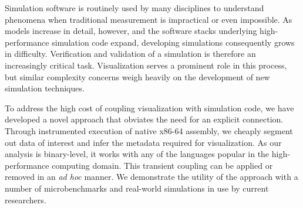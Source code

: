 \newcommand{\addr}[1]{\texttt{#1}}


%

Simulation software is routinely used by many disciplines to understand
phenomena when traditional measurement is impractical or even
impossible.  As models increase in detail, however, and the software
stacks underlying high-performance simulation code expand, developing
simulations consequently grows in difficulty.  Verification and
validation of a simulation is therefore an increasingly critical task.
Visualization serves a prominent role in this process, but similar
complexity concerns weigh heavily on the development of new simulation
techniques.

To address the high cost of coupling visualization with simulation
code, we have developed a novel approach that obviates the need for
an explicit connection.  Through instrumented execution of native
x86-64 assembly, we cheaply segment out data of interest and infer the
metadata required for visualization.  As our analysis is binary-level,
it works with any of the languages popular in the high-performance
computing domain.  This transient coupling can be applied or removed
in an \textit{ad hoc} manner.  We demonstrate the utility of the
approach with a number of microbenchmarks and real-world simulations
in use by current researchers.

